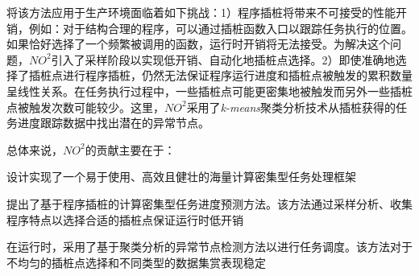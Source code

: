 将该方法应用于生产环境面临着如下挑战：1）程序插桩将带来不可接受的性能开销，例如：对于结构合理的程序，可以通过插桩函数入口以跟踪任务执行的位置。如果恰好选择了一个频繁被调用的函数，运行时开销将无法接受。为解决这个问题，$NO^2$引入了采样阶段以实现低开销、自动化地插桩点选择。2）即使准确地选择了插桩点进行程序插桩，仍然无法保证程序运行进度和插桩点被触发的累积数量呈线性关系。在任务执行过程中，一些插桩点可能更密集地被触发而另外一些插桩点被触发次数可能较少。这里，$NO^2$采用了\emph{k-means}聚类分析技术从插桩获得的任务进度跟踪数据中找出潜在的异常节点。

总体来说，$NO^2$的贡献主要在于：

设计实现了一个易于使用、高效且健壮的海量计算密集型任务处理框架

提出了基于程序插桩的计算密集型任务进度预测方法。该方法通过采样分析、收集程序特点以选择合适的插桩点保证运行时低开销

在运行时，采用了基于聚类分析的异常节点检测方法以进行任务调度。该方法对于不均匀的插桩点选择和不同类型的数据集赏表现稳定